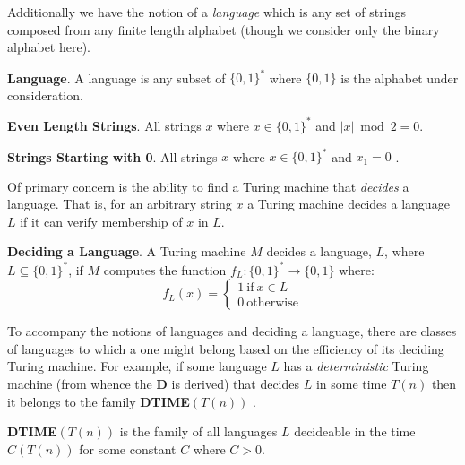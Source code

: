 \documentclass[usletter]{article}
\begin{document}
Additionally we have the notion of a \textit{language} which is any set of strings composed from any finite length alphabet (though we consider only the binary alphabet here).

\begin{definition}
  \textbf{Language}. A language is any subset of $\{0, 1\}^*$ where $\{0, 1\}$ is the alphabet under consideration.
\end{definition}

\begin{example}
  \textbf{Even Length Strings}. All strings $x$ where $x \in \{0, 1\}^*$ and $|x| \bmod 2 = 0$.
\end{example}

\begin{example}
  \textbf{Strings Starting with 0}. All strings $x$ where $x \in \{0, 1\}^*$ and $x_1 = 0$ .
\end{example}

Of primary concern is the ability to find a Turing machine that \textit{decides} a language. That is, for an arbitrary string $x$ a Turing machine decides a language $L$ if it can verify membership of $x$ in $L$.

\begin{definition}
  \textbf{Deciding a Language}. A Turing machine $M$ decides a language, $L$,  where $ L \subseteq \{0,1\}^*$, if $M$ computes the function $f_L : \{0, 1\}^* \rightarrow \{0,1\}$ where:
  \begin{equation*}
    f_L(x) =
    \begin{cases}
      1\ \text{if}\ x \in L \\
      0\ \text{otherwise}
    \end{cases}
  \end{equation*}
\end{definition}

To accompany the notions of languages and deciding a language, there are classes of languages to which a one might belong based on the efficiency of its deciding Turing machine. For example, if some language $L$ has a \textit{deterministic} Turing machine (from whence the \textbf{D} is derived) that decides $L$ in some time $T(n)$ then it belongs to the family \textbf{DTIME}$(T(n))$ \cite{textbook}.

\begin{definition}
  \textbf{DTIME}$(T(n))$ is the family of all languages $L$ decideable in the time $C(T(n))$ for some constant $C$ where $C > 0$.
\end{definition}
\end{document}
